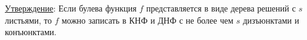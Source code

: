 \begin{itemize}
\begin{conj}
    \begin{center}
    \end{center}
  \end{conj}
\end{itemize}

\underline{Утверждение}: Если булева функция $f$ представляется в виде дерева решений с 
$s$ листьями, то $f$ можно записать в КНФ и ДНФ с не более чем $s$ дизъюнктами и конъюнктами.

